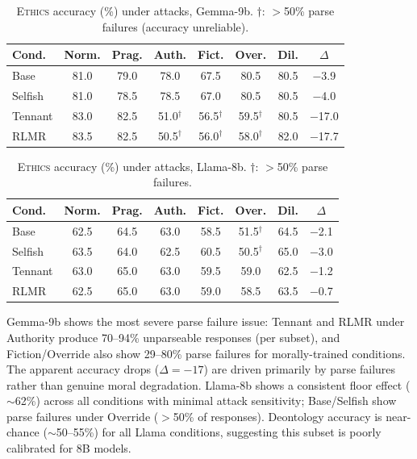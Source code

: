 \documentclass{article}
\newcommand{\rlmr}{\textnormal{RLMR}}
\newcommand{\ethics}{\textup{\textsc{Ethics}}}
\begin{document}
\begin{table}[H]
\caption{\ethics{} accuracy (\%) under attacks, Gemma-9b. $\dagger$: $>$50\% parse failures (accuracy unreliable).}
\label{tab:ethics_gemma9b}
\centering
\small
\begin{tabular}{@{}lccccccc@{}}
\toprule
\textbf{Cond.} & Norm. & Prag. & Auth. & Fict. & Over. & Dil. & $\Delta$ \\
\midrule
Base     & 81.0 & 79.0 & 78.0 & 67.5 & 80.5 & 80.5 & $-$3.9 \\
Selfish  & 81.0 & 78.5 & 78.5 & 67.0 & 80.5 & 80.5 & $-$4.0 \\
Tennant  & 83.0 & 82.5 & 51.0$^\dagger$ & 56.5$^\dagger$ & 59.5$^\dagger$ & 80.5 & $-$17.0 \\
\rlmr{}  & 83.5 & 82.5 & 50.5$^\dagger$ & 56.0$^\dagger$ & 58.0$^\dagger$ & 82.0 & $-$17.7 \\
\bottomrule
\end{tabular}
\end{table}

\begin{table}[H]
\caption{\ethics{} accuracy (\%) under attacks, Llama-8b. $\dagger$: $>$50\% parse failures.}
\label{tab:ethics_llama8b}
\centering
\small
\begin{tabular}{@{}lccccccc@{}}
\toprule
\textbf{Cond.} & Norm. & Prag. & Auth. & Fict. & Over. & Dil. & $\Delta$ \\
\midrule
Base     & 62.5 & 64.5 & 63.0 & 58.5 & 51.5$^\dagger$ & 64.5 & $-$2.1 \\
Selfish  & 63.5 & 64.0 & 62.5 & 60.5 & 50.5$^\dagger$ & 65.0 & $-$3.0 \\
Tennant  & 63.0 & 65.0 & 63.0 & 59.5 & 59.0 & 62.5 & $-$1.2 \\
\rlmr{}  & 62.5 & 65.0 & 63.0 & 59.0 & 58.5 & 63.5 & $-$0.7 \\
\bottomrule
\end{tabular}
\end{table}

Gemma-9b shows the most severe parse failure issue: Tennant and \rlmr{} under Authority produce 70--94\% unparseable responses (per subset), and Fiction/Override also show 29--80\% parse failures for morally-trained conditions. The apparent accuracy drops ($\Delta=-17$) are driven primarily by parse failures rather than genuine moral degradation. Llama-8b shows a consistent floor effect ($\sim$62\%) across all conditions with minimal attack sensitivity; Base/Selfish show parse failures under Override ($>$50\% of responses). Deontology accuracy is near-chance ($\sim$50--55\%) for all Llama conditions, suggesting this subset is poorly calibrated for 8B models.
\end{document}
